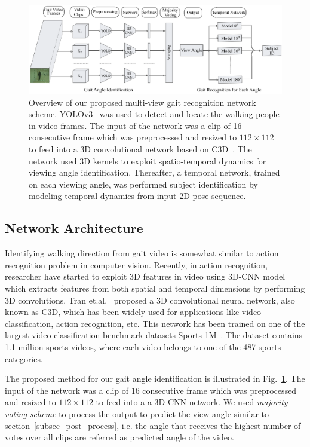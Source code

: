 \begin{figure}
	\centering
	\includegraphics[width=\textwidth]{figures/multi_view_gait_recognition.eps}
	\caption[Overview of our proposed multi-view gait recognition network scheme] 
	{Overview of our proposed multi-view gait recognition network scheme. YOLOv3~\cite{Redmon_18} was used to detect and locate the walking people in video frames. The input of the network was a clip of 16 consecutive frame which was preprocessed and resized to $112\times112$ to feed into a 3D convolutional network based on C3D~\cite{Tran_15}. The network used 3D kernels to exploit spatio-temporal dynamics for viewing angle identification. Thereafter, a temporal network, trained on each viewing angle, was performed subject identification by modeling temporal dynamics from input 2D pose sequence. \label{fig:multi_view_gait_recognition}
	}
	
\end{figure}

\subsection{Network Architecture}
Identifying walking direction from gait video is somewhat similar to action recognition problem in computer vision. Recently, in action recognition, researcher have started to exploit 3D features in video using 3D-CNN model which extracts features from both spatial and temporal dimensions by performing 3D convolutions. Tran et.al.~\cite{Tran_15} proposed a 3D convolutional neural network, also known as C3D, which has been widely used for applications like video classification, action recognition, etc. This network has been trained on one of the largest video classification benchmark datasets Sports-1M~\cite{karpathy_14}. The dataset contains 1.1 million sports videos, where each video belongs to one of the 487 sports categories. 

The proposed method for our gait angle identification is illustrated in Fig.~\ref{fig:multi_view_gait_recognition}. The input of the network was a clip of 16 consecutive frame which was preprocessed and resized to $112\times112$ to feed into a a 3D-CNN network. We used {\textit {majority voting scheme}} to process the output to predict the view angle similar to section~\ref{subsec_post_process}, i.e. the angle that receives the highest number of votes over all clips are referred as predicted angle of the video.

